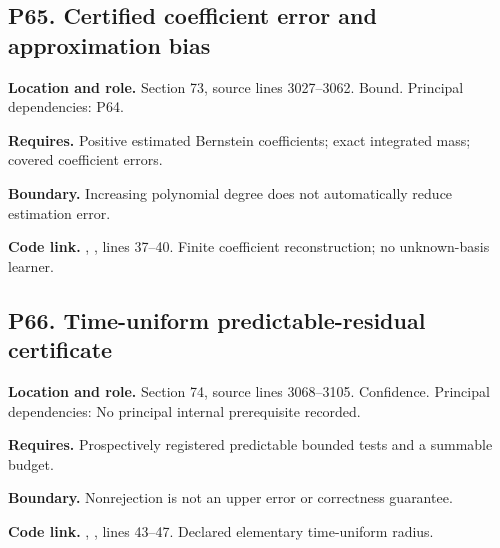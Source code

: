 \documentclass[11pt,letterpaper]{article}
\begin{document}
\par\noindent\begin{minipage}{\textwidth}
\subsection{P65. Certified coefficient error and approximation
bias}\label{p65.-certified-coefficient-error-and-approximation-bias}

\textbf{Location and role.} Section 73, source lines 3027--3062. Bound.
Principal dependencies: P64.

\textbf{Requires.} Positive estimated Bernstein coefficients; exact
integrated mass; covered coefficient errors.

\textbf{Boundary.} Increasing polynomial degree does not automatically
reduce estimation error.

\textbf{Code link.} ,
, lines 37--40. Finite coefficient
reconstruction; no unknown-basis learner.
\end{minipage}\par\medskip

\par\noindent\begin{minipage}{\textwidth}
\subsection{P66. Time-uniform predictable-residual
certificate}\label{p66.-time-uniform-predictable-residual-certificate}

\textbf{Location and role.} Section 74, source lines 3068--3105.
Confidence. Principal dependencies: No principal internal prerequisite
recorded.

\textbf{Requires.} Prospectively registered predictable bounded tests
and a summable budget.

\textbf{Boundary.} Nonrejection is not an upper error or correctness
guarantee.

\textbf{Code link.} ,
, lines 43--47. Declared elementary time-uniform
radius.
\end{minipage}\par\medskip
\end{document}
